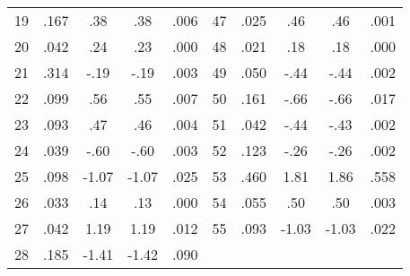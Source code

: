 \documentclass{homework}
\begin{document}
\begin{longproblem}
\begin{center}
\begin{tabular}{c c c c c | c c c c c}
  19  & .167 & .38  & .38   & .006       & 47  & .025  & .46   & .46  & .001    \\
  20  & .042 & .24  & .23   & .000       & 48  & .021  & .18   & .18  & .000    \\
  21  & .314 & -.19 & -.19  & .003       & 49  & .050  & -.44  & -.44 & .002    \\
  22  & .099 & .56  & .55   & .007       & 50  & .161  & -.66  & -.66 & .017    \\
  23  & .093 & .47  & .46   & .004       & 51  & .042  & -.44  & -.43 & .002    \\
  24  & .039 & -.60 & -.60  & .003       & 52  & .123  & -.26  & -.26 & .002    \\
  25  & .098 & -1.07& -1.07 & .025       & 53  & .460  & 1.81  & 1.86 & .558    \\
  26  & .033 & .14  & .13   & .000       & 54  & .055  & .50   & .50  & .003    \\
  27  & .042 & 1.19 & 1.19  & .012       & 55  & .093  & -1.03 & -1.03& .022    \\
  28  & .185 & -1.41& -1.42 & .090 & & & & & \\
\hline
 \end{tabular} 
\end{center}



\end{longproblem}
\end{document}
